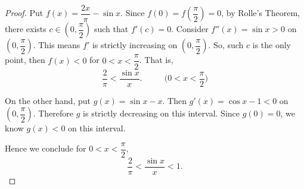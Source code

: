 \begin{Exercise}
	\begin{proof}
		Put $f(x) = \dfrac{2x}{\pi} - \sin x$.
		Since $f(0) = f(\dfrac{\pi}{2}) = 0$, by Rolle's Theorem, there exists $c\in\left(0, \dfrac{\pi}{2}\right)$ such that $f'(c) = 0$.
		Consider $f''(x) = \sin x > 0$ on $\left(0,\dfrac{\pi}{2}\right)$.
		This means $f'$ is strictly increasing on $\left(0,\dfrac{\pi}{2}\right)$.
		So, such $c$ is the only point, then $f(x) < 0$ for $0 < x < \dfrac{\pi}{2}$.
		That is,
		\begin{equation*}
		\frac{2}{\pi} < \frac{\sin x}{x}.\qquad\mbox{ $(0 < x < \frac{\pi}{2}$)}
		\end{equation*}
		
		On the other hand, put $g(x) = \sin x - x$.
		Then $g'(x) = \cos x - 1 < 0$ on $\left( 0, \dfrac{\pi}{2} \right)$.
		Therefore $g$ is strictly decreasing on this interval.
		Since $g(0) = 0$, we know $g(x) < 0$ on this interval.
		
		Hence we conclude for $0 < x < \dfrac{\pi}{2}$,
		$$
		\frac{2}{\pi} < \frac{\sin x}{x} < 1.
		$$
	\end{proof}
\end{Exercise}